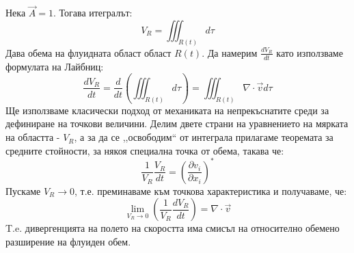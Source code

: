 Нека $\vec{A} = 1$. Тогава итегралът:
\begin{equation*}
	V_{R} = \iiint_{R(t)} d \tau
\end{equation*}
Дава обема на флуидната област област $R(t)$. Да намерим $\frac{d V_{R}}{d t}$ като използваме формулата на Лайбниц:
\begin{equation}
	\frac{d V_{R}}{d t} = \frac{d}{d t} \left( \iiint_{R(t)} d \tau \right) =  \iiint_{R(t)} \nabla \cdot \vec{v} d \tau
\end{equation}
Ще използваме класически подход от механиката на непрекъснатите среди за дефиниране на точкови величини. Делим двете страни на уравнението на мярката на областта - $V_{R}$, а за да се ,,освободим`` от
интеграла прилагаме теоремата за средните стойности, за някоя специална точка от обема, такава че:
\begin{equation*}
	\frac{1}{V_{R}} \frac{V_{R}}{d t} = \left(\frac{\partial v_i}{\partial x_i}\right)^*
\end{equation*}
Пускаме $V_{R} \to 0$, т.е. преминаваме към точкова характеристика и получаваме, че:
\begin{equation}
    \label{eq:expansion_res}
    \lim_{V_{R} \to 0} \left(\frac{1}{V_{R} } \frac{d V_{R}}{d t} \right) = \nabla \cdot \vec{v}
\end{equation}
T.e. дивергенцията на полето на скоростта има смисъл на относително обемено разширение на флуиден обем.
